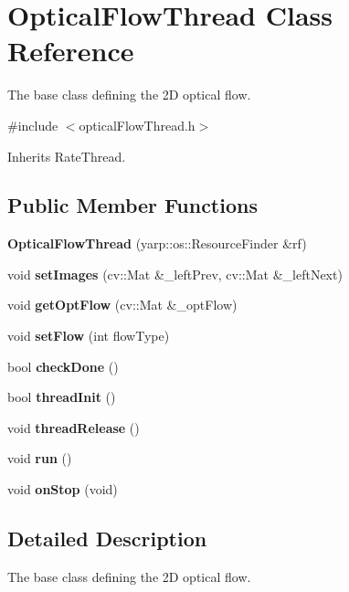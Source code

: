 \section{Optical\+Flow\+Thread Class Reference}
\label{classOpticalFlowThread}


The base class defining the 2D optical flow.  




{\ttfamily \#include $<$optical\+Flow\+Thread.\+h$>$}



Inherits Rate\+Thread.

\subsection*{Public Member Functions}
\begin{DoxyCompactItemize}
\item 
\mbox{\label{classOpticalFlowThread_a2d90f6c196cc33c7d81ec35468896c8c}} 
{\bfseries Optical\+Flow\+Thread} (yarp\+::os\+::\+Resource\+Finder \&rf)
\item 
\mbox{\label{classOpticalFlowThread_a6c04e7a9e28e792ff5d81f65ae11d67a}} 
void {\bfseries set\+Images} (cv\+::\+Mat \&\+\_\+left\+Prev, cv\+::\+Mat \&\+\_\+left\+Next)
\item 
\mbox{\label{classOpticalFlowThread_ab052e551a0ad2f625b72661d9e8a2289}} 
void {\bfseries get\+Opt\+Flow} (cv\+::\+Mat \&\+\_\+opt\+Flow)
\item 
\mbox{\label{classOpticalFlowThread_a2819e22da7950422f51f6331485468cf}} 
void {\bfseries set\+Flow} (int flow\+Type)
\item 
\mbox{\label{classOpticalFlowThread_a8b201fe043a596728a9925bce91b2846}} 
bool {\bfseries check\+Done} ()
\item 
\mbox{\label{classOpticalFlowThread_aecc4312f7a794c9668dd2e8bb6099939}} 
bool {\bfseries thread\+Init} ()
\item 
\mbox{\label{classOpticalFlowThread_a90234a9a3f4aa898413cfb36aac4a979}} 
void {\bfseries thread\+Release} ()
\item 
\mbox{\label{classOpticalFlowThread_a0329bf989f05e6715bbaccde904fe88f}} 
void {\bfseries run} ()
\item 
\mbox{\label{classOpticalFlowThread_ac30f26065348c602f160421aa69a7ed3}} 
void {\bfseries on\+Stop} (void)
\end{DoxyCompactItemize}


\subsection{Detailed Description}
The base class defining the 2D optical flow. 

